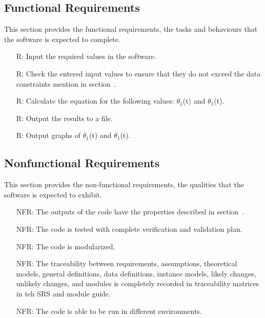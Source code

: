 \documentclass[12pt]{article}
\newcounter{reqnum} %
\begin{document}
\subsection{Functional Requirements}\label{sec_funReq}
This section provides the functional requirements, the tasks and behaviours that the software is expected to complete. \\
\noindent \begin{itemize}

\item[R\refstepcounter{reqnum}\thereqnum \label{R_Inputs}:] 
Input the required values in the software. 
\item[R\refstepcounter{reqnum}\thereqnum \label{R_VarifyInputs}:]  
Check the entered input values to ensure that they do not exceed the data constraints mention in section~.
\item[R\refstepcounter{reqnum}\thereqnum \label{R_Calculate}:] Calculate the equation for the following values: $\theta_1$(t) and $\theta_1$(t).
\item[R\refstepcounter{reqnum}\thereqnum \label{R_Output}:] Output the results to a file.
\item[R\refstepcounter{reqnum}\thereqnum \label{R_Graphs}:] Output graphs of $\theta_1$(t) and $\theta_1$(t).

\end{itemize}

\subsection{Nonfunctional Requirements}\label{sec_nfr}
This section provides the non-functional requirements, the qualities that the software is expected to exhibit.


\noindent \begin{itemize}

\item[NFR\refstepcounter{reqnum}\thereqnum \label{NFR_Correct}:] 
The outputs of the code have the properties described in section~.
\item[NFR\refstepcounter{reqnum}\thereqnum \label{NFR_Verifiable}:]  
The code is tested with complete verification and validation plan.
\item[NFR\refstepcounter{reqnum}\thereqnum \label{R_Reusable}:]
The code is modularized. 
\item[NFR\refstepcounter{reqnum}\thereqnum \label{R_Maintainable}:]
The traceability between requirements, assumptions, theoretical models, general definitions, data definitions, instance models, likely changes, unlikely changes, and modules is completely recorded in traceability matrices in teh SRS and module guide. 
\item[NFR\refstepcounter{reqnum}\thereqnum \label{R_Portable}:]
The code is able to be run in different environments. 
\end{itemize}
\end{document}

